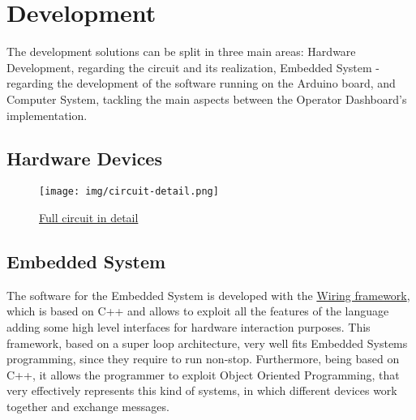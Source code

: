 \documentclass[a4paper,12pt]{report}
\begin{document}
	\chapter{Development}
	The development solutions can be split in three main areas: Hardware Development, regarding the circuit and its realization, Embedded System - regarding the development of the software running on the Arduino board, and Computer System, tackling the main aspects between the Operator Dashboard's implementation.
	
	\section{Hardware Devices}
	\begin{figure}
		\centering
		\texttt{[image: img/circuit-detail.png]}
		\caption{\href{https://www.tinkercad.com/things/1OaxE8QuWbw-esiot-assignment02?sharecode=9QQajaw8It3u4rzvy1XqA17RKAIlDJlUtWD6_dBJsmI}{Full circuit in detail}}
		\label{img:full-circuit}
	\end{figure}
	
	\section{Embedded System}
	The software for the Embedded System is developed with the \href{https://wiring.org.co/}{Wiring framework}, which is based on C++ and allows to exploit all the features of the language adding some high level interfaces for hardware interaction purposes. This framework, based on a super loop architecture, very well fits Embedded Systems programming, since they require to run non-stop. Furthermore, being based on C++, it allows the programmer to exploit Object Oriented Programming, that very effectively represents this kind of systems, in which different devices work together and exchange messages.
	
\end{document}

